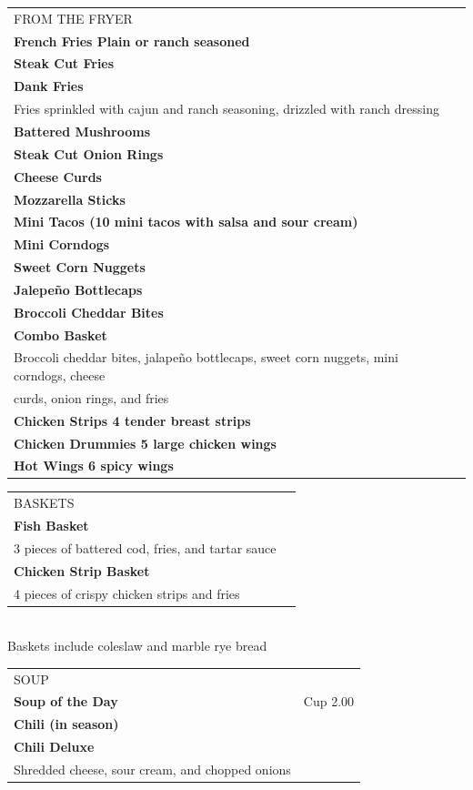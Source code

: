\documentclass[10pt,notitlepage]{article}
\makeatletter
\newcommand*\ColText[1]{\uppercase{#1}}
\newenvironment{Group}[1]
	{\noindent\begin{tabular*}{\textwidth}{@{}p{.8\linewidth}@{\extracolsep{\fill}}r@{}}
		{\fontsize{16}{20}\selectfont\ColText{#1}}\\[0.8em]}
	{\end{tabular*}}
\newcommand*\Item[3]{%
	\sffamily\textbf{\large#1}\dotfill & {\large#2}\hspace*{0.5cm}{\large#3}}
\newcommand*\Desc[1]{%
	\sffamily\hspace*{0.5cm}#1}
\makeatother
\begin{document}
	\vfill{}

	\begin{Group}{From the Fryer}
		\Item{French Fries {\small Plain or ranch seasoned}}{}{2.50} \\
		\Item{Steak Cut Fries}{}{3.00} \\
		\Item{Dank Fries}{}{3.00} \\
		\Desc{Fries sprinkled with cajun and ranch seasoning, drizzled with ranch dressing} \\
		\Item{Battered Mushrooms}{}{4.00} \\
		\Item{Steak Cut Onion Rings}{}{4.00} \\
		\Item{Cheese Curds}{}{4.00} \\
		\Item{Mozzarella Sticks}{}{4.00} \\
		\Item{Mini Tacos {\small (10 mini tacos with salsa and sour cream)}}{}{4.00} \\
		\Item{Mini Corndogs}{}{4.00} \\
		\Item{Sweet Corn Nuggets}{}{4.00} \\
		\Item{Jalepe\~{n}o Bottlecaps}{}{4.00} \\
		\Item{Broccoli Cheddar Bites}{}{4.50} \\
		\Item{Combo Basket}{}{5.00} \\
		\Desc{Broccoli cheddar bites, jalape\~{n}o bottlecaps, sweet corn nuggets, mini corndogs, cheese \\\sffamily\hspace*{0.5cm}curds, onion rings, and fries} \\
		\Item{Chicken Strips {\small 4 tender breast strips}}{}{6.00} \\
		\Item{Chicken Drummies {\small 5 large chicken wings}}{}{6.00} \\
		\Item{Hot Wings {\small 6 spicy wings}}{}{6.00} \\
	\end{Group}

	\vfill{}

	\begin{Group}{Baskets}
		\Item{Fish Basket}{}{7.50} \\
		\Desc{3 pieces of battered cod, fries, and tartar sauce} \\
		\Item{Chicken Strip Basket}{}{7.50} \\
		\Desc{4 pieces of crispy chicken strips and fries} \\
	\end{Group}
	\\[\baselineskip]
	\centering Baskets include coleslaw and marble rye bread \\

	\vfill{}

	\begin{Group}{Soup}
		\Item{Soup of the Day}{Cup 2.00}{Bowl 3.00} \\
		\Item{Chili (in season)}{}{3.00} \\
		\Item{Chili Deluxe}{}{4.00} \\
		\Desc{Shredded cheese, sour cream, and chopped onions} \\
	\end{Group}

	\vfill{}
\end{document}
